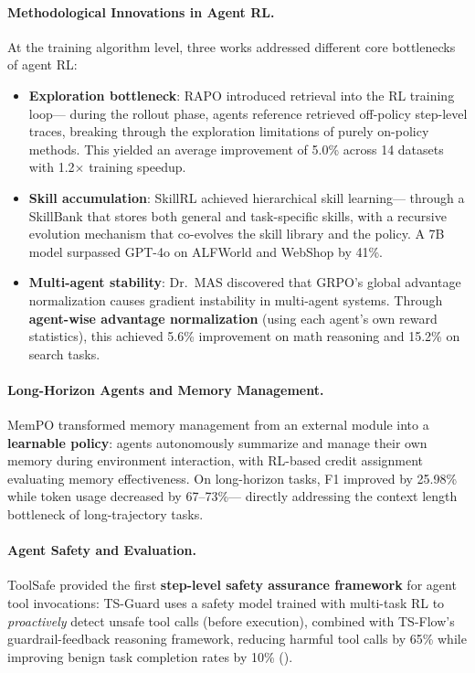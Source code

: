 \paragraph{Methodological Innovations in Agent RL.}
At the training algorithm level, three works addressed different core bottlenecks of agent RL:

\begin{itemize}[leftmargin=2em]
  \item \textbf{Exploration bottleneck}:
    RAPO \cite{zhang2026rapo} introduced retrieval into the RL training loop---
    during the rollout phase, agents reference retrieved off-policy step-level traces,
    breaking through the exploration limitations of purely on-policy methods.
    This yielded an average improvement of 5.0\% across 14 datasets with 1.2$\times$ training speedup.

  \item \textbf{Skill accumulation}:
    SkillRL \cite{xia2026skillrl} achieved hierarchical skill learning---
    through a SkillBank that stores both general and task-specific skills,
    with a recursive evolution mechanism that co-evolves the skill library and the policy.
    A 7B model surpassed GPT-4o on ALFWorld and WebShop by 41\%.

  \item \textbf{Multi-agent stability}:
    Dr.\ MAS \cite{feng2026drmas} discovered that GRPO's global advantage normalization
    causes gradient instability in multi-agent systems.
    Through \textbf{agent-wise advantage normalization}
    (using each agent's own reward statistics),
    this achieved 5.6\% improvement on math reasoning and 15.2\% on search tasks.
\end{itemize}

\paragraph{Long-Horizon Agents and Memory Management.}
MemPO \cite{li2026mempo} transformed memory management from an external module into a \textbf{learnable policy}:
agents autonomously summarize and manage their own memory during environment interaction,
with RL-based credit assignment evaluating memory effectiveness.
On long-horizon tasks, F1 improved by 25.98\%
while token usage decreased by 67--73\%---
directly addressing the context length bottleneck of long-trajectory tasks.

\paragraph{Agent Safety and Evaluation.}
ToolSafe \cite{mou2026toolsafe} provided the first
\textbf{step-level safety assurance framework} for agent tool invocations:
TS-Guard uses a safety model trained with multi-task RL
to \emph{proactively} detect unsafe tool calls (before execution),
combined with TS-Flow's guardrail-feedback reasoning framework,
reducing harmful tool calls by 65\%
while improving benign task completion rates by 10\%
().

